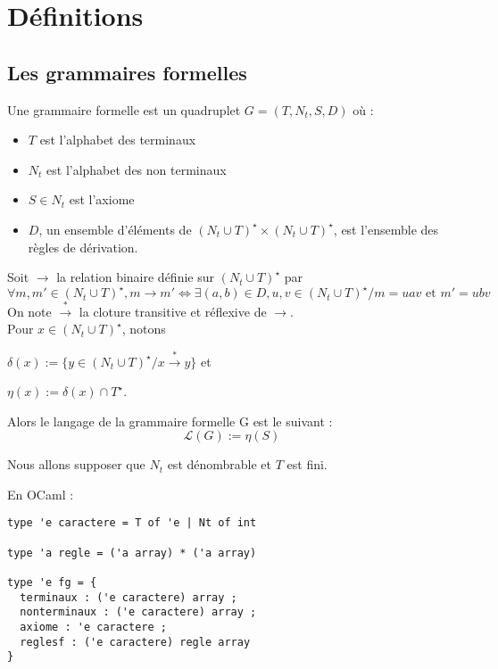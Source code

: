 \documentclass[a4paper,12pt]{article}
\title{\letitle}
\author{\leauthor}
\date{}
\begin{document}
    
\maketitle
\tableofcontents

\section{Définitions}

\subsection{Les grammaires formelles}

Une grammaire formelle est un quadruplet $G = (T,N_t,S,D)$ où :

\begin{itemize}
\item $T$ est l'alphabet des terminaux
\item $N_t$ est l'alphabet des non terminaux
\item $S \in N_t$ est l'axiome
\item $D$, un ensemble d'éléments de $(N_t \cup T)^\star \times (N_t \cup T)^\star$, est l'ensemble des règles de dérivation.
\end{itemize}

Soit $\rightarrow$ la relation binaire définie sur $(N_t \cup T)^\star$ par
\begin{equation}
\forall m,m' \in (N_t \cup T)^\star, m \rightarrow m' \iff \exists (a,b) \in D, u,v \in (N_t \cup T)^\star / m = uav \text{ et } m' = ubv
\end{equation}
On note $\overset{*}{\rightarrow}$ la cloture transitive et réflexive de $\rightarrow$.\\
Pour $x \in (N_t \cup T)^\star$, notons

$\delta(x) := \{y \in (N_t \cup T)^\star / x \overset{*}{\rightarrow} y\}$
et 

$\eta(x) := \delta(x) \cap T^\star$.

Alors le langage de la grammaire formelle  G est le suivant :
\begin{equation*}\mathcal{L} (G) := \eta(S)\end{equation*}

Nous allons supposer que $N_t$ est dénombrable et $T$ est fini.

En OCaml :
\begin{verbatim}
type 'e caractere = T of 'e | Nt of int

type 'a regle = ('a array) * ('a array)

type 'e fg = {
  terminaux : ('e caractere) array ;
  nonterminaux : ('e caractere) array ;
  axiome : 'e caractere ;
  reglesf : ('e caractere) regle array
} 
\end{verbatim}
\end{document}
